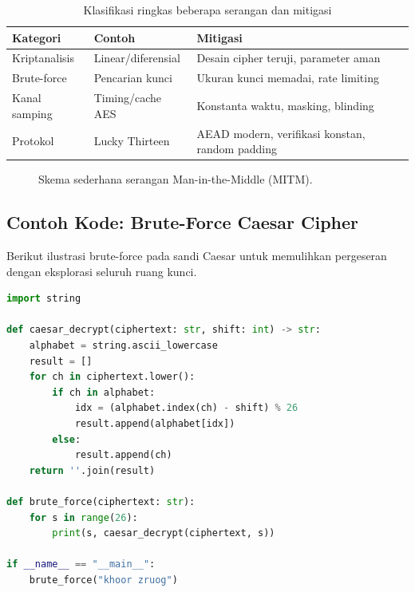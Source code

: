 \documentclass[../main.tex]{subfiles}
\begin{document}
\begin{table}[htbp]
\centering
\caption{Klasifikasi ringkas beberapa serangan dan mitigasi}
\label{tab:serangan}
\begin{tabular}{lll}
\toprule
Kategori & Contoh & Mitigasi \\
\midrule
Kriptanalisis & Linear/diferensial & Desain cipher teruji, parameter aman \\
Brute-force & Pencarian kunci & Ukuran kunci memadai, rate limiting \\
Kanal samping & Timing/cache AES \parencite{bernstein2005aes} & Konstanta waktu, masking, blinding \\
Protokol & Lucky Thirteen \parencite{lucky13} & AEAD modern, verifikasi konstan, random padding \\
\bottomrule
\end{tabular}
\end{table}

\begin{figure}[htbp]
\centering
{}
\caption{Skema sederhana serangan Man-in-the-Middle (MITM).}
\label{fig:mitm}
\end{figure}

\subsection{Contoh Kode: Brute-Force Caesar Cipher}
Berikut ilustrasi brute-force pada sandi Caesar untuk memulihkan pergeseran dengan eksplorasi seluruh ruang kunci.

\begin{lstlisting}[language=Python, caption={Brute-force Caesar}, label={lst:caesar}]
import string

def caesar_decrypt(ciphertext: str, shift: int) -> str:
    alphabet = string.ascii_lowercase
    result = []
    for ch in ciphertext.lower():
        if ch in alphabet:
            idx = (alphabet.index(ch) - shift) % 26
            result.append(alphabet[idx])
        else:
            result.append(ch)
    return ''.join(result)

def brute_force(ciphertext: str):
    for s in range(26):
        print(s, caesar_decrypt(ciphertext, s))

if __name__ == "__main__":
    brute_force("khoor zruog")
\end{lstlisting}
\end{document}
